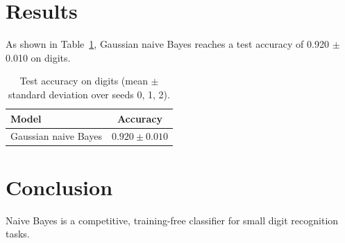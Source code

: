 \documentclass[11pt]{article}
\begin{document}
\section{Results}
As shown in Table~\ref{tab:digits-nb}, Gaussian naive Bayes reaches a test accuracy of
0.920 $\pm$ 0.010 on digits.

\begin{table}[t]
\centering
\caption{Test accuracy on digits (mean $\pm$ standard deviation over seeds 0, 1, 2).}
\label{tab:digits-nb}
\begin{tabular}{lc}
\toprule
Model & Accuracy \\
\midrule
Gaussian naive Bayes & $0.920 \pm 0.010$ \\
\bottomrule
\end{tabular}
\end{table}

\section{Conclusion}
Naive Bayes is a competitive, training-free classifier for small digit recognition tasks.
\end{document}
